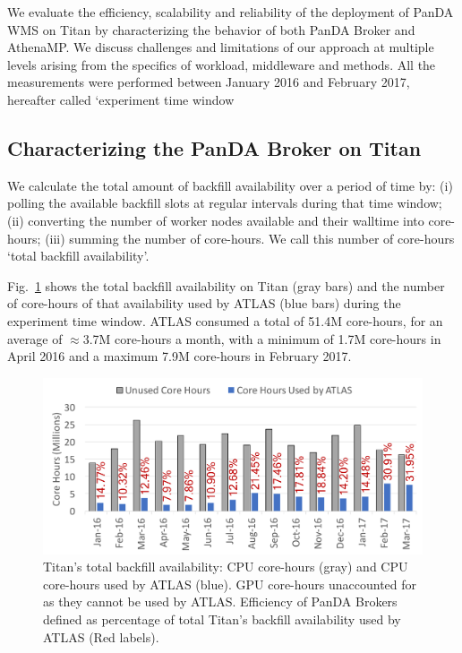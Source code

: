 We evaluate the efficiency, scalability and reliability of the deployment of
PanDA WMS on Titan by characterizing the behavior of both PanDA Broker and
AthenaMP\@. We discuss challenges and limitations of our approach at multiple
levels arising from the specifics of workload, middleware and methods. All
the measurements were performed between January 2016 and February 2017,
hereafter called ‘experiment time window

\subsection{Characterizing the PanDA Broker on Titan}
\label{ssec:broker_titan}

We calculate the total amount of backfill availability over a period of time
by: (i) polling the available backfill slots at regular intervals during that
time window; (ii) converting the number of worker nodes available and their
walltime into core-hours; (iii) summing the number of core-hours. We call
this number of core-hours `total backfill availability'.

Fig.~\ref{fig:backfill-utilization} shows the total backfill availability on
Titan (gray bars) and the number of core-hours of that availability used by
ATLAS (blue bars) during the experiment time window. ATLAS consumed a total
of 51.4M core-hours, for an average of $\approx$3.7M core-hours a month, with
a minimum of 1.7M core-hours in April 2016 and a maximum 7.9M core-hours in
February 2017.

\begin{figure}[!t]
    \includegraphics[clip,width=\columnwidth]{figures/backfill_consumption.pdf}
    \vspace{-0.3in}
    \caption{Titan's total backfill availability: CPU core-hours (gray) and
    CPU core-hours used by ATLAS (blue). GPU core-hours unaccounted for as
    they cannot be used by ATLAS. Efficiency of PanDA Brokers defined as
    percentage of total Titan's backfill availability used by ATLAS (Red
    labels).}
\label{fig:backfill-utilization}
\end{figure}

